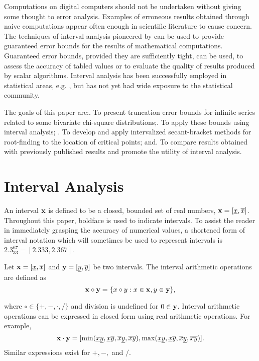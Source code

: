 Computations on digital computers should not be undertaken without giving 
some thought to error analysis.
Examples of  erroneous results obtained through naive computations
appear often enough in scientific literature to cause concern.
The techniques of interval analysis pioneered by \cite{Moore66,
Moore79} can be used to provide guaranteed error bounds for the
results of mathematical computations.
Guaranteed error bounds, provided they are sufficiently tight, can be used,
to assess the accuracy of tabled values or to evaluate the quality of
results produced by scalar algorithms.
Interval analysis has been successfully employed in statistical areas, e.g.
\cite{WangKennedyJASA}, but has not yet had wide exposure to the
statistical community.
\begin{flushleft}
The goals of this paper are:. To present truncation error bounds for infinite series related to some
bivariate chi-square distributions;. To apply these bounds using interval analysis; . To develop and apply intervalized secant-bracket methods for root-finding
to the location of critical points; and. To compare results obtained with previously published results and promote
the utility of interval analysis.
\end{flushleft}

\section{Interval Analysis}

An interval ${\bf x}$ is defined to be a closed, bounded set of real numbers,
$ {\bf x} = [\underline{x}, \overline{x}]$.  Throughout this paper, boldface
is used to indicate intervals.  To assist the reader in immediately 
grasping the accuracy of numerical values, a shortened form of interval 
notation which will sometimes be used to represent intervals
is $2.3_{33}^{67} = [2.333, 2.367]$.

Let ${\bf x} = [\underline{x}, \overline{x}]$ and 
${\bf y} = [\underline{y}, \overline{y}]$ 
be two  intervals.  The interval arithmetic
operations are defined as 
$$
{\bf x} \circ {\bf y} = \{ x \circ y : x \in {\bf x}, y \in {\bf y}\},
$$

where $\circ \in \{+, -, \cdot, / \}$ and division is undefined 
for $0 \in {\bf y}$.
Interval arithmetic operations can be expressed in closed form using real 
arithmetic operations.  For example,
$$
{\bf x} \cdot {\bf y} = 
[\min(\underline{x}\underline{y},\underline{x}\overline{y},
      \overline{x}\underline{y}, \overline{x}\overline{y}),
\max(\underline{x}\underline{y},\underline{x}\overline{y},
      \overline{x}\underline{y}, \overline{x}\overline{y})].
$$
Similar expressions exist for $+, -,$ and $/$.


